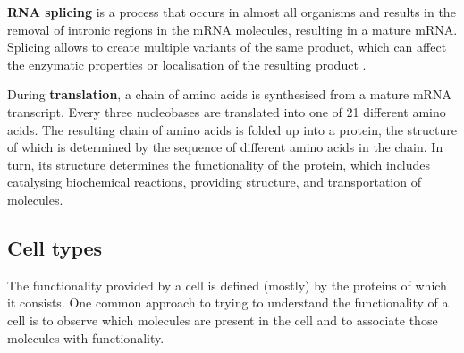 %
%
%
%

\textbf{RNA splicing} is a process that occurs in almost all organisms and results in the removal of intronic regions in the mRNA molecules, resulting in a mature mRNA. 
Splicing allows to create multiple variants of the same product, which can affect the enzymatic properties or localisation of the resulting product \cite{kelemen_functionalternativesplicing_2013}.

During \textbf{translation}, a chain of amino acids is synthesised from a mature mRNA transcript. 
Every three nucleobases are translated into one of 21 different amino acids. The resulting chain of amino acids is folded up into a protein, the structure of which is determined by the sequence of different amino acids in the chain. In turn, its structure determines the functionality of the protein, which includes catalysing biochemical reactions, providing structure, and transportation of molecules. 

\subsection{Cell types}
The functionality provided by a cell is defined (mostly) by the proteins of which it consists. One common approach to trying to understand the functionality of a cell is to observe which molecules are present in the cell and to associate those molecules with functionality. 

